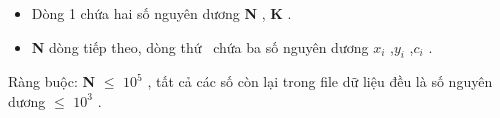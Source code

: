 \begin{itemize}
	\item     Dòng 1 chứa hai số nguyên dương    \textbf{     N    }    ,    \textbf{     K    }    .   
	\item \textbf{     N    }    dòng tiếp theo, dòng thứ     chứa ba số nguyên dương $x_{i}$    ,$y_{i}$    ,$c_{i}$    .   
\end{itemize}

   Ràng buộc:   \textbf{    N   }    $\le$ $10^{5}$   , tất cả các số còn lại trong file dữ liệu đều là số nguyên dương  $\le$ $10^{3}$   .